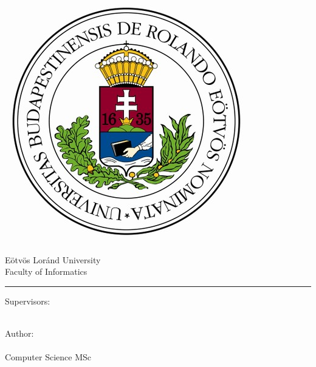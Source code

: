 \begin{titlepage}

\begin{minipage}{0.40\linewidth}
\includegraphics[scale=0.3]{img/elte-cimer}
\end{minipage}
\begin{minipage}{0.50\linewidth}
\begin{center}
Eötvös Loránd University \\
Faculty of Informatics \\
\TANSZEK
\end{center}
\end{minipage}

\hrule
\vfill

\begin{center}
\Huge
\textbf{\CIM}
\normalsize
\end{center}

\vfill

\begin{minipage}[t]{0.5\linewidth}
\noindent
Supervisors:\\
\textbf{\TEMAVEZETO} \hfill \textbf{\TEMAVEZETTO}\\
\TEMAVEZETOBEOSZTAS  \hfill \TEMAVEZETTOBEOSZTAS
\end{minipage}
\begin{minipage}[t]{0.5\linewidth}
\begin{flushright}
Author: \\
\textbf{\SZERZO} \\
Computer Science MSc
\end{flushright}
\end{minipage}


\end{titlepage}

